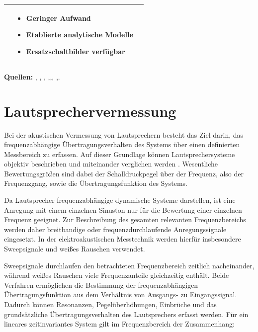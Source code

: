 \begin{table}[htbp]
\begin{tabularx}{\textwidth}{|X|X|X|}
\begin{itemize}[leftmargin=*, nosep, topsep=0pt, parsep=0pt]
\end{itemize}
\vspace{-2mm}
&
\vspace{-2mm}
\begin{itemize}[leftmargin=*, nosep, topsep=0pt, parsep=0pt]
    \item Geringer Aufwand
    \item Etablierte analytische Modelle
    \item Ersatzschaltbilder verfügbar
\end{itemize}
\vspace{-2mm} \\
\hline
\end{tabularx}

\vspace{0.2cm}
\scriptsize
\textbf{Quellen:} \cite{Bai2001}, \cite{Blauert1997}, \cite{Cremer1996}, \cite{Harris2000},\cite{Moeser2005},\cite{Moeser2010}, \cite{Weinzierl2025},\cite{Zenker2019}.
\end{table}


\section{Lautsprechervermessung}

Bei der akustischen Vermessung von Lautsprechern besteht das Ziel darin, das frequenzabhängige Übertragungsverhalten des Systems über einen definierten Messbereich zu erfassen. Auf dieser Grundlage können Lautsprechersysteme objektiv beschrieben und miteinander verglichen werden \cite{Goerne2011}. Wesentliche Bewertungsgrößen sind dabei der Schalldruckpegel über der Frequenz, also der Frequenzgang, sowie die Übertragungsfunktion des Systems.

Da Lautsprecher frequenzabhängige dynamische Systeme darstellen, ist eine Anregung mit einem einzelnen Sinuston nur für die Bewertung einer einzelnen Frequenz geeignet. Zur Beschreibung des gesamten relevanten Frequenzbereichs werden daher breitbandige oder frequenzdurchlaufende Anregungssignale eingesetzt. In der elektroakustischen Messtechnik werden hierfür insbesondere Sweepsignale und weißes Rauschen verwendet.

Sweepsignale durchlaufen den betrachteten Frequenzbereich zeitlich nacheinander, während weißes Rauschen viele Frequenzanteile gleichzeitig enthält. Beide Verfahren ermöglichen die Bestimmung der frequenzabhängigen Übertragungsfunktion aus dem Verhältnis von Ausgangs- zu Eingangssignal. Dadurch können Resonanzen, Pegelüberhöhungen, Einbrüche und das grundsätzliche Übertragungsverhalten des Lautsprechers erfasst werden. Für ein lineares zeitinvariantes System gilt im Frequenzbereich der Zusammenhang:

